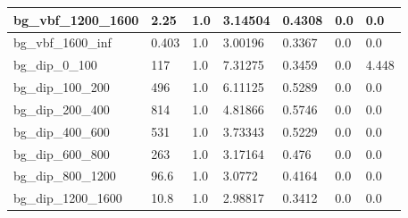 \documentclass[a4paper, 10pt]{article}
\begin{document}
\begin{table}[H]
\begin{center}
\begin{tabular}{|m{23.0mm}|m{23.0mm}|m{18.0mm}|m{19.0mm}|m{19.0mm}|m{19.0mm}|m{19.0mm}|}
      \hline
      {\cellcolor{white}         bg\_vbf\_1200\_1600}& {\cellcolor{white}         2.25}& {\cellcolor{white}         1.0}& {\cellcolor{white}         3.14504}& {\cellcolor{white}         0.4308}& {\cellcolor{green}         0.0}& {\cellcolor{green}         0.0}\\
      \hline
      {\cellcolor{white}         bg\_vbf\_1600\_inf}& {\cellcolor{white}         0.403}& {\cellcolor{white}         1.0}& {\cellcolor{white}         3.00196}& {\cellcolor{white}         0.3367}& {\cellcolor{green}         0.0}& {\cellcolor{green}         0.0}\\
      \hline
      {\cellcolor{white}         bg\_dip\_0\_100}& {\cellcolor{white}         117}& {\cellcolor{white}         1.0}& {\cellcolor{white}         7.31275}& {\cellcolor{white}         0.3459}& {\cellcolor{green}         0.0}& {\cellcolor{green}         4.448}\\
      \hline
      {\cellcolor{white}         bg\_dip\_100\_200}& {\cellcolor{white}         496}& {\cellcolor{white}         1.0}& {\cellcolor{white}         6.11125}& {\cellcolor{white}         0.5289}& {\cellcolor{green}         0.0}& {\cellcolor{green}         0.0}\\
      \hline
      {\cellcolor{white}         bg\_dip\_200\_400}& {\cellcolor{white}         814}& {\cellcolor{white}         1.0}& {\cellcolor{white}         4.81866}& {\cellcolor{white}         0.5746}& {\cellcolor{green}         0.0}& {\cellcolor{green}         0.0}\\
      \hline
      {\cellcolor{white}         bg\_dip\_400\_600}& {\cellcolor{white}         531}& {\cellcolor{white}         1.0}& {\cellcolor{white}         3.73343}& {\cellcolor{white}         0.5229}& {\cellcolor{green}         0.0}& {\cellcolor{green}         0.0}\\
      \hline
      {\cellcolor{white}         bg\_dip\_600\_800}& {\cellcolor{white}         263}& {\cellcolor{white}         1.0}& {\cellcolor{white}         3.17164}& {\cellcolor{white}         0.476}& {\cellcolor{green}         0.0}& {\cellcolor{green}         0.0}\\
      \hline
      {\cellcolor{white}         bg\_dip\_800\_1200}& {\cellcolor{white}         96.6}& {\cellcolor{white}         1.0}& {\cellcolor{white}         3.0772}& {\cellcolor{white}         0.4164}& {\cellcolor{green}         0.0}& {\cellcolor{green}         0.0}\\
      \hline
      {\cellcolor{white}         bg\_dip\_1200\_1600}& {\cellcolor{white}         10.8}& {\cellcolor{white}         1.0}& {\cellcolor{white}         2.98817}& {\cellcolor{white}         0.3412}& {\cellcolor{green}         0.0}& {\cellcolor{green}         0.0}\\

\end{tabular}
\end{center}
\end{table}
\end{document}
